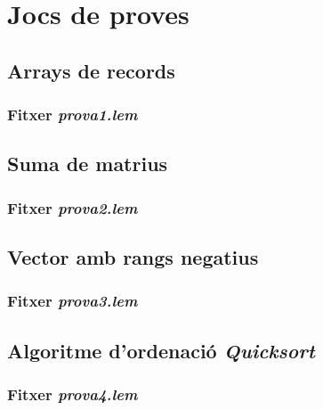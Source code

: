 \section{Jocs de proves}
\subsection{Arrays de records}
\subsubsection{Fitxer \emph{prova1.lem}}

\newpage

\subsection{Suma de matrius}
\subsubsection{Fitxer \emph{prova2.lem}}

\newpage

\subsection{Vector amb rangs negatius}
\subsubsection{Fitxer \emph{prova3.lem}}

\newpage

\subsection{Algoritme d'ordenació \emph{Quicksort}}
\subsubsection{Fitxer \emph{prova4.lem}}

\newpage


